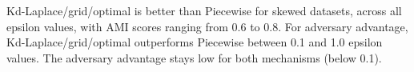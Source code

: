 {\begin{figure}[H]
  \end{figure}
  Kd-Laplace/grid/optimal is better than Piecewise for skewed datasets, across all epsilon values, with AMI scores ranging from 0.6 to 0.8. For adversary advantage, Kd-Laplace/grid/optimal outperforms Piecewise between 0.1 and 1.0 epsilon values. The adversary advantage stays low for both mechanisms (below 0.1).
}